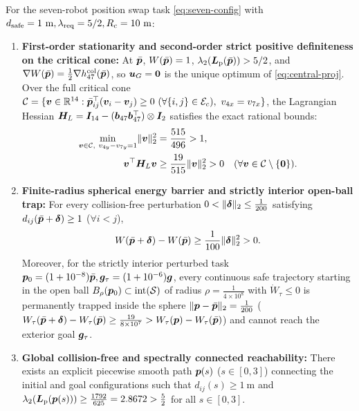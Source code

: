 \begin{theorem}\label{thm:seven-kkt}
For the seven-robot position swap task \eqref{eq:seven-config} with $d_{\mathrm{safe}}=1\ \mathrm m,\lambda_{\mathrm{req}}=5/2,R_c=10\ \mathrm m$:
\begin{enumerate}
 \item \textbf{First-order stationarity and second-order strict positive definiteness on the critical cone:} At $\bar{\boldsymbol{p}}$, $W(\bar{\boldsymbol{p}})=1$, $\lambda_2(\boldsymbol{L}_{\mathrm{p}}(\bar{\boldsymbol{p}}))>5/2$, and $\nabla W(\bar{\boldsymbol{p}})=\frac12\nabla h_{47}^{\mathrm{col}}(\bar{\boldsymbol{p}})$, so $\boldsymbol{u}_G=\boldsymbol 0$ is the unique optimum of \eqref{eq:central-proj}. Over the full critical cone $\mathcal C=\{\boldsymbol v\in\mathbb R^{14}:\bar{\boldsymbol{p}}_{ij}^{\top}(\boldsymbol v_i-\boldsymbol v_j)\ge 0\ (\forall\{i,j\}\in\mathcal E_c),\ v_{4x}=v_{7x}\}$, the Lagrangian Hessian $\boldsymbol H_L=\boldsymbol{I}_{14}-(\boldsymbol b_{47}\boldsymbol b_{47}^{\top})\otimes\boldsymbol{I}_2$ satisfies the exact rational bounds:
 \begin{equation}
 \begin{split}
  \min_{\boldsymbol v\in\mathcal C,\ v_{4y}-v_{7y}=1}\lVert\boldsymbol v\rVert_2^2&=\frac{515}{496}>1,\\
  \boldsymbol v^{\top}\boldsymbol H_L\boldsymbol v&\ge\frac{19}{515}\lVert\boldsymbol v\rVert_2^2>0\quad(\forall\boldsymbol v\in\mathcal C\setminus\{\boldsymbol 0\}).
 \end{split}\label{eq:critical-hessian}
 \end{equation}
 \item \textbf{Finite-radius spherical energy barrier and strictly interior open-ball trap:} For every collision-free perturbation $0<\lVert\boldsymbol\delta\rVert_2\le\frac1{200}$ satisfying $d_{ij}(\bar{\boldsymbol{p}}+\boldsymbol\delta)\ge 1$ ($\forall i<j$),
 \begin{equation}
  W(\bar{\boldsymbol{p}}+\boldsymbol\delta)-W(\bar{\boldsymbol{p}})\ge\frac{1}{100}\lVert\boldsymbol\delta\rVert_2^2>0.
  \label{eq:finite-barrier}
 \end{equation}
 Moreover, for the strictly interior perturbed task $\boldsymbol{p}_0=(1+10^{-8})\bar{\boldsymbol{p}},\boldsymbol{g}_\tau=(1+10^{-6})\boldsymbol{g}$, every continuous safe trajectory starting in the open ball $B_\rho(\boldsymbol{p}_0)\subset\operatorname{int}(\mathcal S)$ of radius $\rho=\frac{1}{4\times 10^8}$ with $\dot W_\tau\le 0$ is permanently trapped inside the sphere $\lVert\boldsymbol{p}-\bar{\boldsymbol{p}}\rVert_2=\frac1{200}$ ($W_\tau(\bar{\boldsymbol{p}}+\boldsymbol\delta)-W_\tau(\bar{\boldsymbol{p}})\ge\frac{19}{8\times 10^7}>W_\tau(\boldsymbol{p})-W_\tau(\bar{\boldsymbol{p}})$) and cannot reach the exterior goal $\boldsymbol{g}_\tau$.
 \item \textbf{Global collision-free and spectrally connected reachability:} There exists an explicit piecewise smooth path $\boldsymbol{p}(s)$ ($s\in[0,3]$) connecting the initial and goal configurations such that $d_{ij}(s)\ge 1\ \mathrm m$ and $\lambda_2(\boldsymbol{L}_{\mathrm{p}}(\boldsymbol{p}(s)))\ge\frac{1792}{625}=2.8672>\frac52$ for all $s\in[0,3]$.
\end{enumerate}
\end{theorem}
